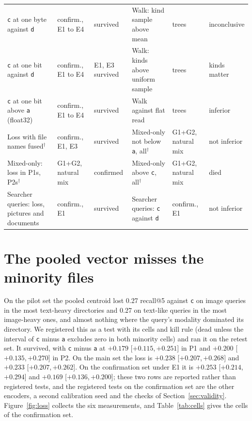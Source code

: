 \documentclass[sigconf,natbib=true,anonymous=true]{acmart}
\newcommand{\rep}[1]{\texttt{#1}}
\newcommand{\ci}[2]{[\ensuremath{#1},\,\ensuremath{#2}]}  %
\begin{document}
\begin{table}[t]
\begin{tabular}{lll|lll}
\rep{c} at one byte against \rep{d} & confirm., E1 to E4 & survived & Walk: kind sample above mean & trees & inconclusive \\
\rep{c} at one bit against \rep{d} & confirm., E1 to E4 & E1, E3 survived & Walk: kinds above uniform sample & trees & kinds matter \\
\rep{c} at one bit above \rep{a} (float32) & confirm., E1 to E4 & survived & Walk against flat read & trees & inferior \\
Loss with file names fused$^\dagger$ & confirm., E1, E3 & survived & Mixed-only not below \rep{a}, all$^\dagger$ & G1+G2, natural mix & not inferior \\
Mixed-only: loss in P1s, P2s$^\dagger$ & G1+G2, natural mix & confirmed & Mixed-only above \rep{c}, all$^\dagger$ & G1+G2, natural mix & died \\
Searcher queries: loss, pictures and documents & confirm., E1 & survived & Searcher queries: \rep{c} against \rep{d} & confirm., E1 & not inferior \\
\bottomrule
\end{tabular}
\end{table}

\section{The pooled vector misses the minority files}
\label{sec:loss}

On the pilot set the pooled centroid lost 0.27 recall@5 against \rep{c} on image queries in the most text-heavy directories and 0.27 on text-like queries in the most image-heavy ones, and almost nothing where the query's modality dominated its directory. We registered this as a test with its cells and kill rule (dead unless the interval of \rep{c} minus \rep{a} excludes zero in both minority cells) and ran it on the retest set. It survived, with \rep{c} minus \rep{a} at $+0.179$ \ci{+0.115}{+0.251} in P1 and $+0.200$ \ci{+0.135}{+0.270} in P2. On the main set the loss is $+0.238$ \ci{+0.207}{+0.268} and $+0.233$ \ci{+0.207}{+0.262}. On the confirmation set under E1 it is $+0.253$ \ci{+0.214}{+0.294} and $+0.169$ \ci{+0.136}{+0.200}; these two rows are reported rather than registered tests, and the registered tests on the confirmation set are the other encoders, a second calibration seed and the checks of Section~\ref{sec:validity}. Figure~\ref{fig:loss} collects the six measurements, and Table~\ref{tab:cells} gives the cells of the confirmation set.
\end{document}
